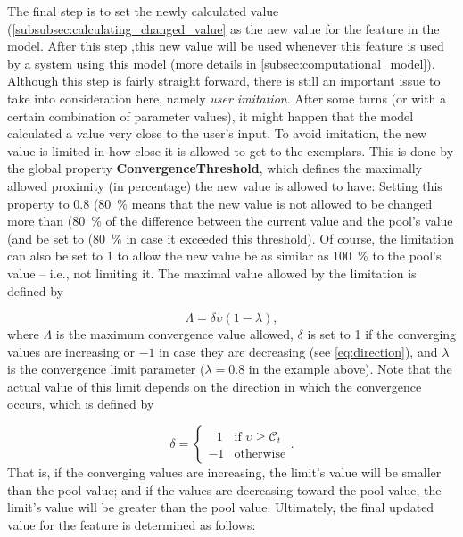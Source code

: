 The final step is to set the newly calculated value (\cref{subsubsec:calculating_changed_value} as the new value for the feature in the model.
After this step ,this new value will be used whenever this feature is used by a system using this model (more details in \cref{subsec:computational_model}).
Although this step is fairly straight forward, there is still an important issue to take into consideration here, namely \textit{user imitation}.
After some turns (or with a certain combination of parameter values), it might happen that the model calculated a value very close to the user's input.
To avoid imitation, the new value is limited in how close it is allowed to get to the exemplars.
This is done by the global property \textbf{ConvergenceThreshold}, which defines the maximally allowed proximity (in percentage) the new value is allowed to have:
Setting this property to 0.8 (\SI{80}{\percent} means that the new value is not allowed to be changed more than (\SI{80}{\percent} of the difference between the current value and the pool's value (and be set to (\SI{80}{\percent} in case it exceeded this threshold).
Of course, the limitation can also be set to 1 to allow the new value be as similar as \SI{100}{\percent} to the pool's value -- i.e., not limiting it.
The maximal value allowed by the limitation is defined by

\begin{equation}
\label{eq:conv_limit}
\Lambda = \delta \upsilon \left(1 - \lambda \right),
\end{equation}
\noindent
where $\Lambda$ is the maximum convergence value allowed, $\delta$ is set to 1 if the converging values are increasing or $-1$ in case they are decreasing (see \cref{eq:direction}), and $\lambda$ is the convergence limit parameter ($\lambda=0.8$ in the example above).
\noindent
Note that the actual value of this limit depends on the direction in which the convergence occurs, which is defined by

\begin{equation}
\label{eq:direction}
\delta = 		
\begin{cases}
\ \ \ 1 & \text{if } \upsilon \geq \mathcal{C}_t\\
-1 & \text{otherwise}
\end{cases}.
\end{equation}
\noindent
That is, if the converging values are increasing, the limit's value will be smaller than the pool value;
and if the values are decreasing toward the pool value, the limit's value will be greater than the pool value.
Ultimately, the final updated value for the feature is determined as follows:

